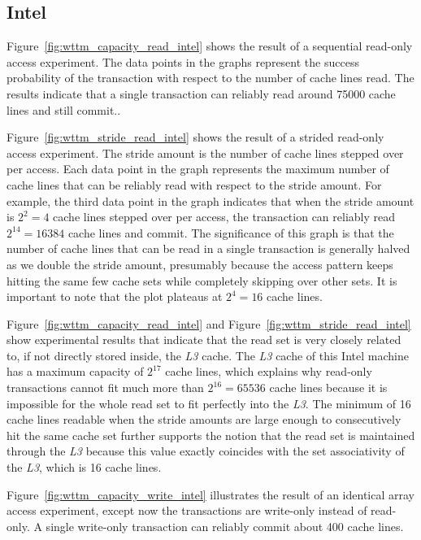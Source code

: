 \documentclass{article}
\begin{document}
\subsection*{Intel}

Figure~\ref{fig:wttm_capacity_read_intel} shows the result of a sequential
read-only access experiment. The data points in the graphs represent the success
probability of the transaction with respect to the number of cache lines read.
The results indicate that a single transaction can reliably read 
around 75000 cache lines and still commit..

Figure~\ref{fig:wttm_stride_read_intel} shows the result of a strided read-only
access experiment. The stride amount is the number of cache lines stepped over
per access. Each data point in the graph represents the maximum number of cache
lines that can be reliably read with respect to the stride amount. For example,
the third data point in the graph indicates that when the stride amount is
$2^2=4$ cache lines stepped over per access, the transaction can reliably read
$2^{14}=16384$ cache lines and commit. The significance of this graph is that
the number of cache lines that can be read in a single transaction is generally
halved as we double the stride amount, presumably because the access pattern
keeps hitting the same few cache sets while completely skipping over other sets.
It is important to note that the plot plateaus at $2^4=16$ cache lines.

Figure~\ref{fig:wttm_capacity_read_intel} and
Figure~\ref{fig:wttm_stride_read_intel} show experimental results that indicate
that the read set is very closely related to, if not directly stored inside, the
\textit{L3} cache. The \textit{L3} cache of this Intel machine has a maximum
capacity of $2^{17}$ cache lines, which explains why read-only transactions
cannot fit much more than $2^{16}=65536$ cache lines because it is impossible
for the whole read set to fit perfectly into the \textit{L3}. The minimum of 16
cache lines readable when the stride amounts are large enough to consecutively
hit the same cache set further supports the notion that the read set is
maintained through the \textit{L3} because this value exactly coincides with the
set associativity of the \textit{L3}, which is 16 cache lines.

Figure~\ref{fig:wttm_capacity_write_intel} illustrates the result of an
identical array access experiment, except now the transactions are write-only
instead of read-only. A single write-only transaction can reliably commit about
400 cache lines.
\end{document}
